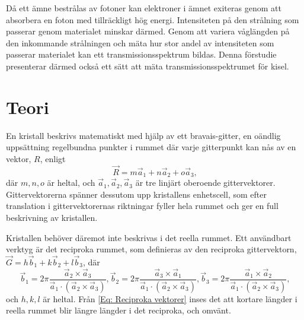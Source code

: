\documentclass[12pt, a4paper]{article}
\begin{document}
Då ett ämne bestrålas av fotoner kan elektroner i ämnet exiteras genom att absorbera en foton med tillräckligt hög energi. 
Intensiteten på den strålning som passerar genom materialet minskar därmed. 
Genom att variera våglängden på den inkommande strålningen och mäta hur stor andel av intensiteten som passerar materialet kan ett transmissionsspektrum bildas\cite{Transmission}. 
Denna förstudie presenterar därmed också ett sätt att mäta transmissionsspektrumet för kisel.

\section{Teori}
En kristall beskrivs matematiskt med hjälp av ett bravais-gitter, en oändlig uppsättning regelbundna punkter i rummet där varje gitterpunkt kan nås av en vektor, $R$, enligt
\begin{equation}
    \vec R = m\vec a_1 + n \vec a_2 + o \vec a_3,
\end{equation}
där $m, n, o$ är heltal, och $\vec a_1, \vec a_2, \vec a_3$ är tre linjärt oberoende gittervektorer. Gittervektorerna spänner dessutom upp kristallens enhetscell, som efter translation i gittervektorernas riktningar fyller hela rummet och ger en full beskrivning av kristallen.

Kristallen behöver däremot inte beskrivas i det reella rummet. Ett användbart verktyg är det reciproka rummet, som definieras av den reciproka gittervektorn, $\vec G = h\vec b_1+k\vec b_2+l\vec b_3$, där
\begin{equation}
    \vec b_1 = 2\pi \dfrac{\vec a_2 \times \vec a_3}{\vec a_1 \cdot(\vec a_2 \times \vec a_3)}, 
    \vec b_2 = 2\pi \dfrac{\vec a_3 \times \vec a_1}{\vec a_1 \cdot(\vec a_2 \times \vec a_3)},
    \vec b_3 = 2\pi \dfrac{\vec a_1 \times \vec a_2}{\vec a_1 \cdot(\vec a_2 \times \vec a_3)},
    \label{Eq: Reciproka vektorer}
\end{equation}
och $h,k,l$ är heltal. Från \ref{Eq: Reciproka vektorer} inses det att kortare längder i reella rummet blir längre längder i det reciproka, och omvänt\cite{Hofmann}.
\end{document}
